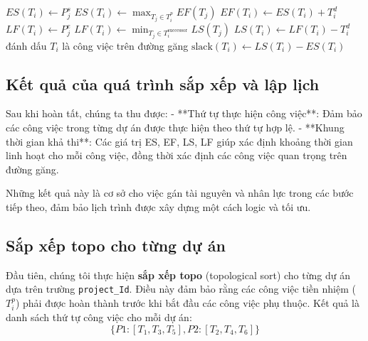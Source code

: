 \documentclass[a4paper,12pt]{article}
\begin{document}
\begin{algorithm}
\begin{algorithmic}[1]
     \State {}
                \State $ES(T_i) \gets P_j^s$ 
          \Else
                \State $ES(T_i) \gets \max_{T_j \in T_i^p} EF(T_j)$
          \EndIf
          \State $EF(T_i) \gets ES(T_i) + T_i^d$
     \EndFor
     \State {}
                \State $LF(T_i) \gets P_j^e$ 
          \Else
                \State $LF(T_i) \gets \min_{T_j \in T_i^{\text{successor}}} LS(T_j)$
          \EndIf
          \State $LS(T_i) \gets LF(T_i) - T_i^d$
     \EndFor
     \State {}
                \State đánh dấu $T_i$ là công việc trên đường găng
          \EndIf
          \State $\text{slack}(T_i) \gets LS(T_i) - ES(T_i)$
     \EndFor
\EndFunction
\end{algorithmic}
\end{algorithm}

\subsection{Kết quả của quá trình sắp xếp và lập lịch}

Sau khi hoàn tất, chúng ta thu được:
- **Thứ tự thực hiện công việc**: Đảm bảo các công việc trong từng dự án được thực hiện theo thứ tự hợp lệ.
- **Khung thời gian khả thi**: Các giá trị ES, EF, LS, LF giúp xác định khoảng thời gian linh hoạt cho mỗi công việc, đồng thời xác định các công việc quan trọng trên đường găng.

Những kết quả này là cơ sở cho việc gán tài nguyên và nhân lực trong các bước tiếp theo, đảm bảo lịch trình được xây dựng một cách logic và tối ưu.

\subsection{Sắp xếp topo cho từng dự án}
Đầu tiên, chúng tôi thực hiện \textbf{sắp xếp topo} (topological sort) cho từng dự án dựa trên trường \texttt{project\_Id}. Điều này đảm bảo rằng các công việc tiền nhiệm ($T_i^p$) phải được hoàn thành trước khi bắt đầu các công việc phụ thuộc. Kết quả là danh sách thứ tự công việc cho mỗi dự án:
\[
\{ P1: [T_1, T_3, T_5], P2: [T_2, T_4, T_6] \}
\]
\end{document}
